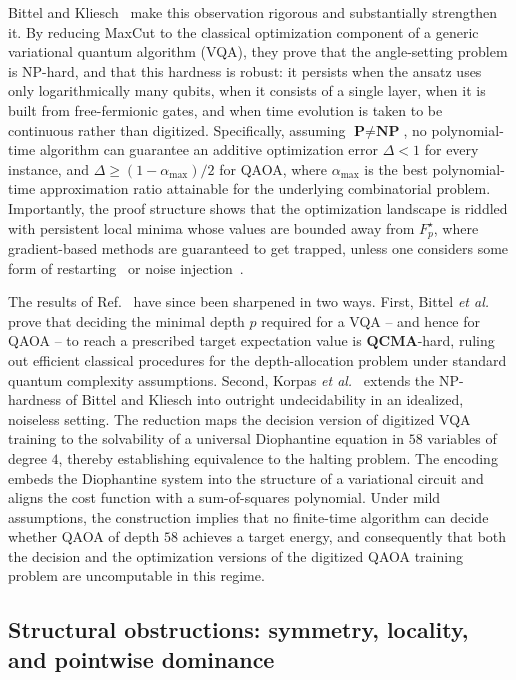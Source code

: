 \documentclass[twocolumn,
english,
aps,
pra,
10pt,
longbibliography,
superscriptaddress,
amsmath,
amssymb,
floatfix
]{revtex4-2}
\begin{document}
Bittel and Kliesch~\cite{Bittel_2021} make this observation rigorous and substantially strengthen it.
By reducing MaxCut to the classical optimization component of a generic variational quantum algorithm (VQA), they prove that the angle-setting problem is NP-hard, and that this hardness is robust: it persists when the ansatz uses only logarithmically many qubits, when it consists of a single layer, when it is built from free-fermionic gates, and when time evolution is taken to be continuous rather than digitized.
Specifically, assuming $\textbf{P}\neq\textbf{NP}$, no polynomial-time algorithm can guarantee an additive optimization error $\Delta < 1$ for every instance, and  $\Delta\geq(1-\alpha_{\max})/2$ for QAOA, where $\alpha_{\max}$ is the best polynomial-time approximation ratio attainable for the underlying combinatorial problem.
Importantly, the proof structure shows that the optimization landscape is riddled with persistent local minima whose values are bounded away from $F_p^\star$, where  gradient-based methods are guaranteed to get trapped, unless one considers some form of restarting~\cite{11389907} or noise injection~\cite{kungurtsev2024iteration}. 

The results of Ref.~\cite{Bittel_2021} have since been sharpened in two ways.
First, Bittel \emph{et al.}~\cite{bittelQCMA} prove that deciding the minimal depth $p$ required for a VQA -- and hence for QAOA -- to reach a prescribed target expectation value is $\textbf{QCMA}$-hard, ruling out efficient classical procedures for the depth-allocation problem under standard quantum complexity assumptions.
Second, Korpas \emph{et al.}~\cite{korpas2025undecidable} extends the NP-hardness of Bittel and Kliesch into outright undecidability in an idealized, noiseless setting.
The reduction maps the decision version of digitized VQA training to the solvability of a universal Diophantine equation in $58$ variables of degree $4$, thereby establishing equivalence to the halting problem.
The encoding embeds the Diophantine system into the structure of a variational circuit and aligns the cost function with a sum-of-squares polynomial.
Under mild assumptions, the construction implies that no finite-time algorithm can decide whether QAOA of depth $58$ achieves a target energy, and consequently that both the decision and the optimization versions of the digitized QAOA training problem are uncomputable in this regime.

\subsection{Structural obstructions: symmetry, locality, and pointwise dominance}
\end{document}
